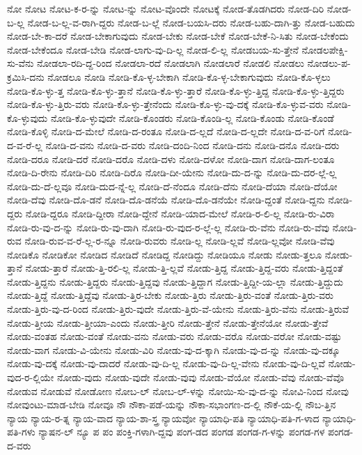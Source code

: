 {ನೋ
ನೋಟ
ನೋಟ-ಕ-ರ-ನ್ನು
ನೋಟ-ನ್ನು
ನೋಟ-ವೊಂದೇ
ನೋಟಕ್ಕೆ
ನೋಡ-ತೊಡಗಿದರು
ನೋಡ-ದಿರಿ
ನೋಡ-ಬ-ಲ್ಲ
ನೋಡ-ಬ-ಲ್ಲ-ವ-ರಾಗಿ-ದ್ದರು
ನೋಡ-ಬ-ಲ್ಲೆ
ನೋಡ-ಬಯಸಿ-ದರು
ನೋಡ-ಬಹು-ದಾಗಿ-ತ್ತು
ನೋಡ-ಬಹುದು
ನೋಡ-ಬೇ-ಕಾ-ದರೆ
ನೋಡ-ಬೇಕಾಗುವುದು
ನೋಡ-ಬೇಕು
ನೋಡ-ಬೇಕೆ
ನೋಡ-ಬೇಕೆ-ನಿ-ಸಿತು
ನೋಡ-ಬೇಕೆಂದು
ನೋಡ-ಬೇಕೆಂದೂ
ನೋಡ-ಬೇಡಿ
ನೋಡ-ಲಾಗು-ವು-ದಿ-ಲ್ಲ
ನೋಡ-ಲಿ-ಲ್ಲ
ನೋಡಬಯ-ಸು-ತ್ತೇನೆ
ನೋಡಲಪೇಕ್ಷಿ-ಸು-ವೆನು
ನೋಡಲಾ-ರದಿ-ದ್ದ-ರಿಂದ
ನೋಡಲಾ-ರದೆ
ನೋಡಲಾಗಿ
ನೋಡಲಾರೆ
ನೋಡಲಿ
ನೋಡಲು
ನೋಡಲು-ಪ-ಕ್ರಮಿಸಿ-ದನು
ನೋಡಲೂ
ನೋಡಿ
ನೋಡಿ-ಕೊ-ಳ್ಳ-ಬೇಕಾಗಿ
ನೋಡಿ-ಕೊ-ಳ್ಳ-ಬೇಕಾಗುವುದು
ನೋಡಿ-ಕೊ-ಳ್ಳಲು
ನೋಡಿ-ಕೊ-ಳ್ಳು-ತ್ತ
ನೋಡಿ-ಕೊ-ಳ್ಳು-ತ್ತಾನೆ
ನೋಡಿ-ಕೊ-ಳ್ಳು-ತ್ತಾರೆ
ನೋಡಿ-ಕೊ-ಳ್ಳು-ತ್ತಿದ್ದ
ನೋಡಿ-ಕೊ-ಳ್ಳು-ತ್ತಿದ್ದರು
ನೋಡಿ-ಕೊ-ಳ್ಳು-ತ್ತಿರು-ವರು
ನೋಡಿ-ಕೊ-ಳ್ಳು-ತ್ತೇನೆಂದು
ನೋಡಿ-ಕೊ-ಳ್ಳು-ವು-ದಕ್ಕೆ
ನೋಡಿ-ಕೊ-ಳ್ಳುವ-ವರು
ನೋಡಿ-ಕೊ-ಳ್ಳುವುದು
ನೋಡಿ-ಕೊ-ಳ್ಳುವುದೇ
ನೋಡಿ-ಕೊಂಡರು
ನೋಡಿ-ಕೊಂಡಿ-ಲ್ಲ
ನೋಡಿ-ಕೊಂಡು
ನೋಡಿ-ಕೊಂಡೆ
ನೋಡಿ-ಕೊಳ್ಳಿ
ನೋಡಿ-ದ-ಮೇಲೆ
ನೋಡಿ-ದ-ರಂತೂ
ನೋಡಿ-ದ-ಲ್ಲದೆ
ನೋಡಿ-ದ-ಲ್ಲದೇ
ನೋಡಿ-ದ-ವ-ರಿಗೆ
ನೋಡಿ-ದ-ವ-ರೆ-ಲ್ಲ
ನೋಡಿ-ದ-ವನು
ನೋಡಿ-ದ-ವರು
ನೋಡಿ-ದಂದಿ-ನಿಂದ
ನೋಡಿ-ದನು
ನೋಡಿ-ದನೊ
ನೋಡಿ-ದರು
ನೋಡಿ-ದರೂ
ನೋಡಿ-ದರೆ
ನೋಡಿ-ದರೊ
ನೋಡಿ-ದಳು
ನೋಡಿ-ದಳೋ
ನೋಡಿ-ದಾಗ
ನೋಡಿ-ದಾಗ-ಲಂತೂ
ನೋಡಿ-ದಿ-ರೇನು
ನೋಡಿ-ದಿರಿ
ನೋಡಿ-ದಿರೊ
ನೋಡಿ-ದೀ-ಯೇನು
ನೋಡಿ-ದು-ದ-ನ್ನು
ನೋಡಿ-ದು-ದರ-ಲ್ಲೆ-ಲ್ಲ
ನೋಡಿ-ದು-ದೆ-ಲ್ಲವೂ
ನೋಡಿ-ದುದ-ನ್ನೆ-ಲ್ಲ
ನೋಡಿ-ದೆ-ನೆಂದೂ
ನೋಡಿ-ದೆನು
ನೋಡಿ-ದೆಯಾ
ನೋಡಿ-ದೆಯೋ
ನೋಡಿ-ದೆವು
ನೋಡಿ-ದೊ-ಡನೆ
ನೋಡಿ-ದೊ-ಡನೆಯೆ
ನೋಡಿ-ದೊ-ಡನೆಯೇ
ನೋಡಿ-ದ್ದಂತೆ
ನೋಡಿ-ದ್ದನು
ನೋಡಿ-ದ್ದರು
ನೋಡಿ-ದ್ದರೂ
ನೋಡಿ-ದ್ದೀರಾ
ನೋಡಿ-ದ್ದೇನೆ
ನೋಡಿ-ಯಾದ-ಮೇಲೆ
ನೋಡಿ-ರ-ಲಿ-ಲ್ಲ
ನೋಡಿ-ರು-ವಿರಾ
ನೋಡಿ-ರು-ವು-ದ-ನ್ನು
ನೋಡಿ-ರು-ವು-ದಾಗಿ
ನೋಡಿ-ರು-ವುದ-ರ-ಲ್ಲೆ-ಲ್ಲ
ನೋಡಿ-ರು-ವೆನು
ನೋಡಿ-ರು-ವೆವು
ನೋಡಿ-ರುವ
ನೋಡಿ-ರುವ-ವ-ರೆ-ಲ್ಲ-ರ-ನ್ನೂ
ನೋಡಿ-ರುವರು
ನೋಡಿ-ಲ್ಲ
ನೋಡಿ-ಲ್ಲವೆ
ನೋಡಿ-ಲ್ಲವೋ
ನೋಡಿ-ವೆವು
ನೋಡಿಕೊ
ನೋಡಿಕೋ
ನೋಡಿದ
ನೋಡಿದೆ
ನೋಡಿದ್ದ
ನೋಡಿದ್ದು
ನೋಡಿಯೂ
ನೋಡು
ನೋಡು-ತ್ತಲೂ
ನೋಡು-ತ್ತಾನೆ
ನೋಡು-ತ್ತಾರೆ
ನೋಡು-ತ್ತಿ-ರಲಿ-ಲ್ಲ
ನೋಡು-ತ್ತಿ-ಲ್ಲವೆ
ನೋಡು-ತ್ತಿದ್ದ
ನೋಡು-ತ್ತಿದ್ದ-ವರು
ನೋಡು-ತ್ತಿದ್ದಂತೆ
ನೋಡು-ತ್ತಿದ್ದನು
ನೋಡು-ತ್ತಿದ್ದರು
ನೋಡು-ತ್ತಿದ್ದವು
ನೋಡು-ತ್ತಿದ್ದಾಗ
ನೋಡು-ತ್ತಿದ್ದೀ-ಯ-ಲ್ಲಾ
ನೋಡು-ತ್ತಿದ್ದುದು
ನೋಡು-ತ್ತಿದ್ದೆ
ನೋಡು-ತ್ತಿದ್ದೆವು
ನೋಡು-ತ್ತಿರ-ಬೇಕು
ನೋಡು-ತ್ತಿರು
ನೋಡು-ತ್ತಿರು-ವಂತೆ
ನೋಡು-ತ್ತಿರು-ವರು
ನೋಡು-ತ್ತಿರು-ವು-ದ-ರಿಂದ
ನೋಡು-ತ್ತಿರು-ವುದೇ
ನೋಡು-ತ್ತಿರು-ವೆ-ಯೇನು
ನೋಡು-ತ್ತಿರು-ವೆನು
ನೋಡು-ತ್ತಿರುವೆ
ನೋಡು-ತ್ತೀಯ
ನೋಡು-ತ್ತೀಯಾ-ಎಂದು
ನೋಡು-ತ್ತೀರಿ
ನೋಡು-ತ್ತೇನೆ
ನೋಡು-ತ್ತೇನೆಯೋ
ನೋಡು-ತ್ತೇವೆ
ನೋಡು-ವಂತಹ
ನೋಡು-ವಂತೆ
ನೋಡು-ವನು
ನೋಡು-ವರು
ನೋಡು-ವರೊ
ನೋಡು-ವರೋ
ನೋಡು-ವಷ್ಟು
ನೋಡು-ವಾಗ
ನೋಡು-ವಿ-ಯೇನು
ನೋಡು-ವಿರಿ
ನೋಡು-ವು-ದ-ಕ್ಕಾಗಿ
ನೋಡು-ವು-ದ-ನ್ನು
ನೋಡು-ವು-ದಕ್ಕೂ
ನೋಡು-ವು-ದಕ್ಕೆ
ನೋಡು-ವು-ದಾದರೆ
ನೋಡು-ವು-ದಿ-ಲ್ಲ
ನೋಡು-ವು-ದಿ-ಲ್ಲ-ವೇನು
ನೋಡು-ವು-ದಿ-ಲ್ಲವೆ
ನೋಡು-ವುದ-ರ-ಲ್ಲಿಯೇ
ನೋಡು-ವುದು
ನೋಡು-ವುದೇ
ನೋಡು-ವುವು
ನೋಡು-ವೆಯೋ
ನೋಡು-ವೆವು
ನೋಡು-ವೆವೊ
ನೋಡುವ
ನೋಡುವೆ
ನೋಡೋಣ
ನೋಬ-ಲ್
ನೋಬ-ಲ್-ಳನ್ನು
ನೋಯಿ-ಸು-ವು-ದ-ನ್ನು
ನೋವಿ-ನಿಂದ
ನೋವು
ನೋವುಂಟು-ಮಾಡ-ಬೇಡಿ
ನೋವೂ
ನೌ
ನೌಕಾ-ಪಡೆ-ಯನ್ನು
ನೌಕಾ-ಸಭಾಂಗಣ-ದ-ಲ್ಲಿ
ನೌಕೆ-ಯ-ಲ್ಲಿ
ನೌಬ-ತ್ತಿನ
ನ್ಯಾಯ
ನ್ಯಾಯ-ರ-ತ್ನ
ನ್ಯಾಯ-ವಾದ
ನ್ಯಾಯ-ಶಾ-ಸ್ತ್ರ
ನ್ಯಾಯವೋ
ನ್ಯಾಯಾಧಿ-ಪತಿ
ನ್ಯಾಯಾಧಿ-ಪತಿ-ಗ-ಳಾದ
ನ್ಯಾಯಾಧಿ-ಪತಿ-ಗಳು
ನ್ಯಾಷನ-ಲ್
ನ್ಯೂ
ಪ
ಪಂ
ಪಂಕ್ತಿ-ಗಳಾಗಿ-ದ್ದವು
ಪಂಗ-ಡದ
ಪಂಗಡ
ಪಂಗಡ-ಗ-ಳನ್ನು
ಪಂಗಡ-ಗಳ
ಪಂಗಡ-ದ-ವರು
}

